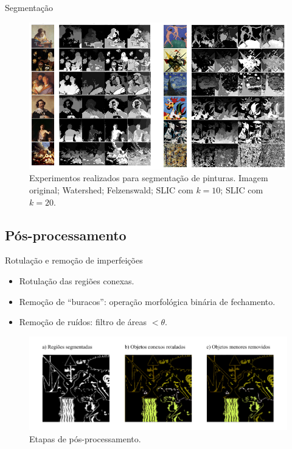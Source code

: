 \documentclass{beamer}
\begin{document}
\begin{frame}{Segmentação}

  \begin{figure}[h!]
\begin{center}
\includegraphics[scale=.35]{figs/compara_segmentacao}
        \caption{Experimentos realizados para segmentação de
        pinturas. Imagem original; Watershed; Felzenswald; SLIC com $k=10$; SLIC com $k=20$.} 
         \label{fig:expsegs} 
\end{center}
\end{figure}

\end{frame}

\subsection{Pós-processamento}

\begin{frame}{Rotulação e remoção de imperfeições}

  \begin{itemize}
    \item<1> Rotulação das regiões conexas.
    \item<2> Remoção de ``buracos'': operação morfológica binária de fechamento.
    \item<3> Remoção de ruídos: filtro de áreas $< \theta$.
  \end{itemize}

\begin{figure}[h!]
\begin{center}
\includegraphics[scale=0.8]{figs/passos_rotulacao}
          \caption{Etapas de pós-processamento.}
        \label{fig:rotulacao}
\end{center}
\end{figure}

\end{frame}
\end{document}

